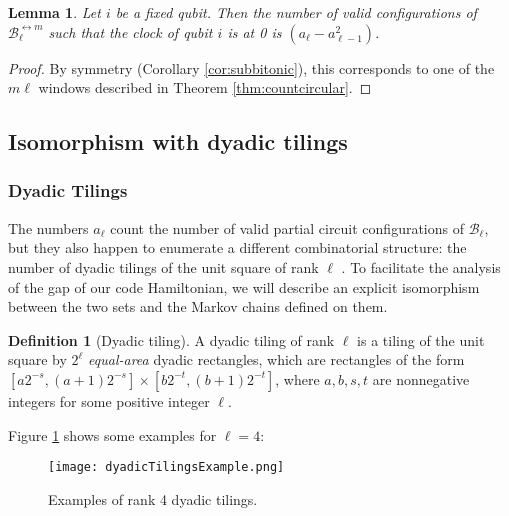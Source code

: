 \documentclass[11pt,letterpaper]{article}
\newtheorem{lemma}[theorem]{Lemma}
\theoremstyle{definition}
\newtheorem{definition}[theorem]{Definition}
\theoremstyle{remark}
\newcommand{\cB}{\mathcal B}
\numberwithin{equation}{section}
\theoremstyle{definition}
\begin{document}
\begin{lemma}\label{lem:circularDensity}
Let $i$ be a fixed qubit. Then the number of valid configurations of $\cB_\ell^{\leftrightarrow m}$ such that the clock of qubit $i$ is at 0 is $(a_\ell - a_{\ell - 1}^2)$.
\end{lemma}

\begin{proof}
By symmetry (Corollary \ref{cor:subbitonic}), this corresponds to one of the $m\ell$ windows described in Theorem \ref{thm:countcircular}.
\end{proof}

%

%

%

%

%

%
%
%
%
%

%

\subsection{Isomorphism with dyadic tilings}

\subsubsection{Dyadic Tilings}

The numbers $a_{\ell}$ count the number of valid partial circuit configurations of $\mathcal{B}_{\ell}$, but they also happen to enumerate a different combinatorial structure: the number of dyadic tilings of the unit square of rank $\ell$ \cite{cannon_et_al:LIPIcs:2017:7583}. To facilitate the analysis of the gap of our code Hamiltonian, we will describe an explicit isomorphism between the two sets and the Markov chains defined on them.
%

%

\begin{definition}[Dyadic tiling]
A dyadic tiling of rank $\ell$ is a tiling of the unit square by $2^{\ell}$ \emph{equal-area} dyadic rectangles, which are rectangles of the form $[a 2^{-s}, (a+1)2^{-s}]\times [b 2^{-t},(b+1) 2^{-t}]$, where $a,b,s,t$ are nonnegative integers for some positive integer $\ell$.
\end{definition}

Figure \ref{fig:dyadicex} shows some examples for $\ell = 4$:
\begin{figure}[h]
\begin{center}
\texttt{[image: dyadicTilingsExample.png]}
\caption{Examples of rank 4 dyadic tilings. \label{fig:dyadicex}}
\end{center}
\end{figure}
\end{document}
